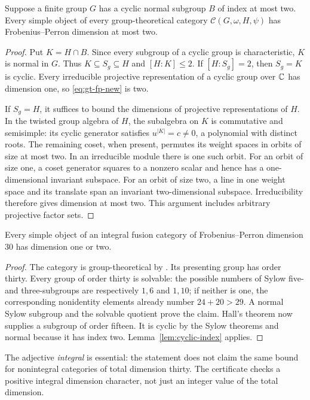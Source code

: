 \begin{lemma}\label{lem:cyclic-index}
Suppose a finite group $G$ has a cyclic normal subgroup $B$ of index at
most two. Every simple object of every group-theoretical category
$\mathcal C(G,\omega,H,\psi)$ has Frobenius--Perron dimension at most two.
\end{lemma}
\begin{proof}
Put $K=H\cap B$. Since every subgroup of a cyclic group is characteristic,
$K$ is normal in $G$. Thus $K\subseteq S_g\subseteq H$ and
$[H:K]\leq2$. If $[H:S_g]=2$, then $S_g=K$ is cyclic. Every irreducible
projective representation of a cyclic group over $\mathbb C$ has dimension one,
so \eqref{eq:gt-fp-new} is two.

If $S_g=H$, it suffices to bound the dimensions of projective
representations of $H$. In the twisted group algebra of $H$, the
subalgebra on $K$ is commutative and semisimple: its cyclic generator
satisfies $u^{|K|}=c\ne0$, a polynomial with distinct roots. The remaining
coset, when present, permutes its weight spaces in orbits of size at most
two. In an irreducible module there is one such orbit. For an orbit of
size one, a coset generator squares to a nonzero scalar and hence has a
one-dimensional invariant subspace. For an orbit of size two, a line in
one weight space and its translate span an invariant two-dimensional
subspace. Irreducibility therefore gives dimension at most two. This
argument includes arbitrary projective factor sets.
\end{proof}

\begin{proposition}\label{prop:dimension30}
Every simple object of an integral fusion category of Frobenius--Perron
dimension $30$ has dimension one or two.
\end{proposition}
\begin{proof}
The category is group-theoretical by
\cite[Theorem~9.2]{ENOWGT}. Its presenting group has order thirty.
Every group of order thirty is solvable: the possible numbers of Sylow
five- and three-subgroups are respectively $1,6$ and $1,10$; if neither
is one, the corresponding nonidentity elements already number $24+20>29$.
A normal Sylow subgroup and the solvable quotient prove the claim.
Hall's theorem now supplies a subgroup of order fifteen. It is cyclic
by the Sylow theorems and normal because it has index two.
Lemma~\ref{lem:cyclic-index} applies.
\end{proof}
The adjective \emph{integral} is essential: the statement does not claim
the same bound for nonintegral categories of total dimension thirty.
The certificate checks a positive integral dimension character, not just
an integer value of the total dimension.

